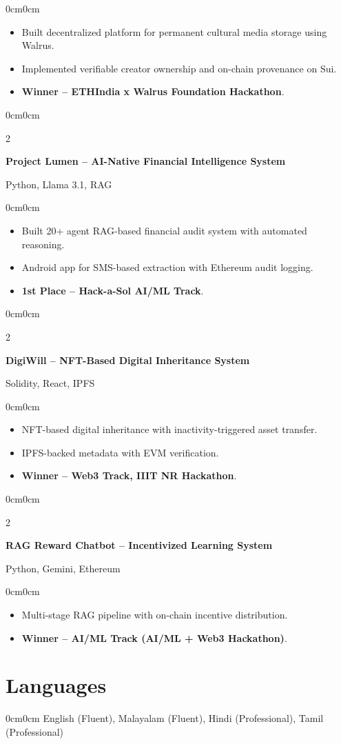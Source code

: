 \documentclass[10pt, letterpaper]{article}
\newenvironment{highlights}{
\begin{itemize}[topsep=1pt, parsep=0pt, partopsep=0pt, itemsep=1pt, leftmargin=10pt]
}{\end{itemize}}
\newenvironment{onecolentry}{\begin{adjustwidth}{0cm}{0cm}}{\end{adjustwidth}}
\newenvironment{twocolentry}[1]{
  \onecolentry
  \def\secondColumn{#1}
  \setcolumnwidth{\fill, 4.3cm}
  \begin{paracol}{2}
}{
  \switchcolumn \raggedleft \secondColumn
  \end{paracol}
  \endonecolentry
}
\begin{document}
\begin{onecolentry}
\begin{highlights}
  \item Built decentralized platform for permanent cultural media storage using Walrus.
  \item Implemented verifiable creator ownership and on-chain provenance on Sui.
  \item \textbf{Winner – ETHIndia x Walrus Foundation Hackathon}.
\end{highlights}
\end{onecolentry}

\begin{twocolentry}{Python, Llama 3.1, RAG}
\textbf{Project Lumen – AI-Native Financial Intelligence System}
\end{twocolentry}

\begin{onecolentry}
\begin{highlights}
  \item Built 20+ agent RAG-based financial audit system with automated reasoning.
  \item Android app for SMS-based extraction with Ethereum audit logging.
  \item \textbf{1st Place – Hack-a-Sol AI/ML Track}.
\end{highlights}
\end{onecolentry}

\begin{twocolentry}{Solidity, React, IPFS}
\textbf{DigiWill – NFT-Based Digital Inheritance System}
\end{twocolentry}

\begin{onecolentry}
\begin{highlights}
  \item NFT-based digital inheritance with inactivity-triggered asset transfer.
  \item IPFS-backed metadata with EVM verification.
  \item \textbf{Winner – Web3 Track, IIIT NR Hackathon}.
\end{highlights}
\end{onecolentry}

\begin{twocolentry}{Python, Gemini, Ethereum}
\textbf{RAG Reward Chatbot – Incentivized Learning System}
\end{twocolentry}

\begin{onecolentry}
\begin{highlights}
  \item Multi-stage RAG pipeline with on-chain incentive distribution.
  \item \textbf{Winner – AI/ML Track (AI/ML + Web3 Hackathon)}.
\end{highlights}
\end{onecolentry}

\section{Languages}
\begin{onecolentry}
English (Fluent), Malayalam (Fluent), Hindi (Professional), Tamil (Professional)
\end{onecolentry}
\end{document}
